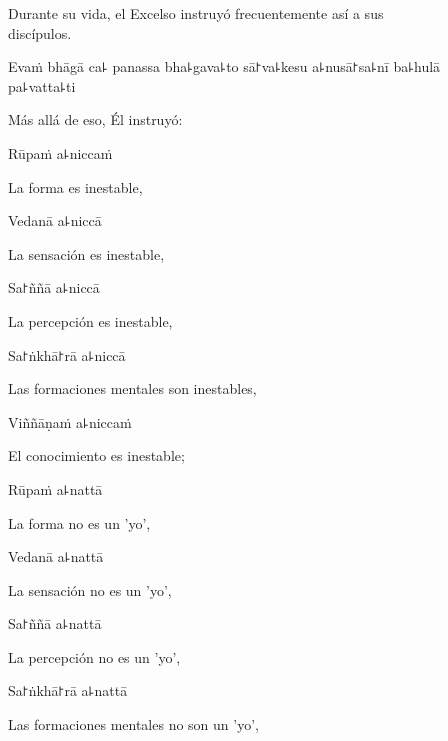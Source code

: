 \begin{english}
  Durante su vida, el Excelso instruyó frecuentemente así a sus\\ discípulos.
\end{english}

Evaṁ bhāgā ca꜕ panassa bha꜕gava꜕to sā꜓va꜕kesu a꜕nusā꜓sa꜕nī ba꜕hulā pa꜕vatta꜕ti

\begin{english}
  Más allá de eso, Él instruyó:
\end{english}


Rūpaṁ a꜕niccaṁ

\begin{english}
  La forma es inestable,
\end{english}

Vedanā a꜕niccā

\begin{english}
  La sensación es inestable,
\end{english}

Sa꜓ññā a꜕niccā

\begin{english}
  La percepción es inestable,
\end{english}

Sa꜓ṅkhā꜓rā a꜕niccā

\begin{english}
  Las formaciones mentales son inestables,
\end{english}

Viññāṇaṁ a꜕niccaṁ

\begin{english}
  El conocimiento es inestable;
\end{english}

Rūpaṁ a꜕nattā

\begin{english}
  La forma no es un 'yo',
\end{english}

Vedanā a꜕nattā

\begin{english}
  La sensación no es un 'yo',
\end{english}

Sa꜓ññā a꜕nattā

\begin{english}
  La percepción no es un 'yo',
\end{english}

Sa꜓ṅkhā꜓rā a꜕nattā

\begin{english}
  Las formaciones mentales no son un 'yo',
\end{english}

